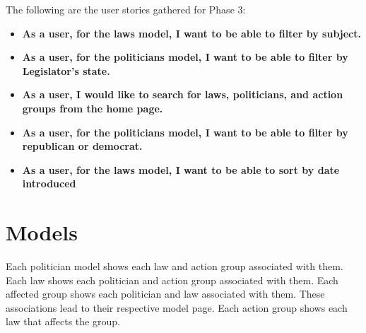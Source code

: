 \documentclass[12pt]{article}
\begin{document}
The following are the user stories gathered for Phase 3: \\
	
\begin{itemize}
	\item\textbf{As a user, for the laws model, I want to be able to filter by subject.} \\
	
	\item\textbf{As a user, for the politicians model, I want to be able to filter by Legislator's state.} \\
	
	\item\textbf{As a user, I would like to search for laws, politicians, and action groups from the home page.} \\
	
	\item\textbf{As a user, for the politicians model, I want to be able to filter by republican or democrat.} \\
	
	\item\textbf{As a user, for the laws model, I want to be able to sort by date introduced} \\
\end{itemize}

\section{Models}
    Each politician model shows each law and action group associated with them. Each law shows each politician and action group associated with them. Each affected group shows each politician and law associated with them. These associations lead to their respective model page. Each action group shows each law that affects the group. \\
\end{document}
